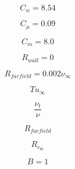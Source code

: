 \begin{equation}
C_w = 8.54
\end{equation}

\begin{equation}
C_{\mu} = 0.09
\end{equation}

\begin{equation}
C_m = 8.0
\end{equation}

\begin{equation}
R_{wall} = 0
\end{equation}

\begin{equation}
R_{farfield} = 0.002 \nu_{\infty}
\end{equation}

\begin{equation}
Tu_\infty
\end{equation}

\begin{equation}
\frac{\nu_t}{\nu}
\end{equation}

\begin{equation}
R_{farfield}
\end{equation}

\begin{equation}
R_{e_{\theta c}}
\end{equation}

\begin{equation}
B=1
\end{equation}


